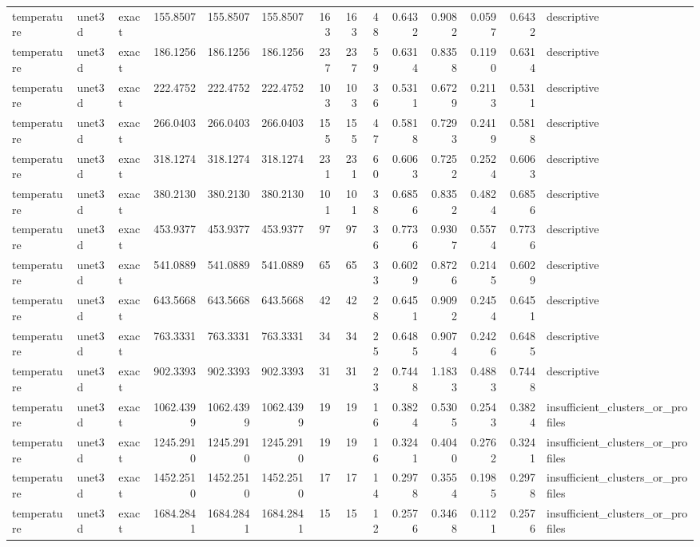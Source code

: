 \begin{tabular}{lllrrrrrrrrrrl}
temperature & unet3d & exact & 155.8507 & 155.8507 & 155.8507 & 163 & 163 & 48 & 0.6432 & 0.9082 & 0.0597 & 0.6432 & descriptive \\
temperature & unet3d & exact & 186.1256 & 186.1256 & 186.1256 & 237 & 237 & 59 & 0.6314 & 0.8358 & 0.1190 & 0.6314 & descriptive \\
temperature & unet3d & exact & 222.4752 & 222.4752 & 222.4752 & 103 & 103 & 36 & 0.5311 & 0.6729 & 0.2113 & 0.5311 & descriptive \\
temperature & unet3d & exact & 266.0403 & 266.0403 & 266.0403 & 155 & 155 & 47 & 0.5818 & 0.7293 & 0.2419 & 0.5818 & descriptive \\
temperature & unet3d & exact & 318.1274 & 318.1274 & 318.1274 & 231 & 231 & 60 & 0.6063 & 0.7252 & 0.2524 & 0.6063 & descriptive \\
temperature & unet3d & exact & 380.2130 & 380.2130 & 380.2130 & 101 & 101 & 38 & 0.6856 & 0.8352 & 0.4824 & 0.6856 & descriptive \\
temperature & unet3d & exact & 453.9377 & 453.9377 & 453.9377 & 97 & 97 & 36 & 0.7736 & 0.9307 & 0.5574 & 0.7736 & descriptive \\
temperature & unet3d & exact & 541.0889 & 541.0889 & 541.0889 & 65 & 65 & 33 & 0.6029 & 0.8726 & 0.2145 & 0.6029 & descriptive \\
temperature & unet3d & exact & 643.5668 & 643.5668 & 643.5668 & 42 & 42 & 28 & 0.6451 & 0.9092 & 0.2454 & 0.6451 & descriptive \\
temperature & unet3d & exact & 763.3331 & 763.3331 & 763.3331 & 34 & 34 & 25 & 0.6485 & 0.9074 & 0.2426 & 0.6485 & descriptive \\
temperature & unet3d & exact & 902.3393 & 902.3393 & 902.3393 & 31 & 31 & 23 & 0.7448 & 1.1833 & 0.4883 & 0.7448 & descriptive \\
temperature & unet3d & exact & 1062.4399 & 1062.4399 & 1062.4399 & 19 & 19 & 16 & 0.3824 & 0.5305 & 0.2543 & 0.3824 & insufficient_clusters_or_profiles \\
temperature & unet3d & exact & 1245.2910 & 1245.2910 & 1245.2910 & 19 & 19 & 16 & 0.3241 & 0.4040 & 0.2762 & 0.3241 & insufficient_clusters_or_profiles \\
temperature & unet3d & exact & 1452.2510 & 1452.2510 & 1452.2510 & 17 & 17 & 14 & 0.2978 & 0.3554 & 0.1985 & 0.2978 & insufficient_clusters_or_profiles \\
temperature & unet3d & exact & 1684.2841 & 1684.2841 & 1684.2841 & 15 & 15 & 12 & 0.2576 & 0.3468 & 0.1121 & 0.2576 & insufficient_clusters_or_profiles \\

\end{tabular}
